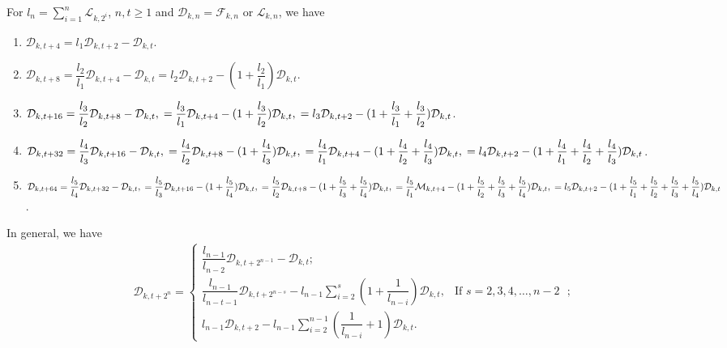 \begin{theorem} For $l_n=\sum\limits_{i=1}^n\mathcal{L}_{k,2^i}$, $n, t\geq 1$ and $\mathcal{D}_{k,n}=\mathcal{F}_{k,n}$ or $\mathcal{L}_{k,n}$, we have\label{3.10}
\begin{enumerate}
\item $\mathcal{D}_{k,t+4}=l_1\mathcal{D}_{k,t+2}-\mathcal{D}_{k,t} $.
\item $\mathcal{D}_{k,t+8}=\dfrac{l_2}{l_1}\mathcal{D}_{k,t+4}-\mathcal{D}_{k,t} =l_2\mathcal{D}_{k,t+2}-(1+\dfrac{l_2}{l_1})\mathcal{D}_{k,t} $.
\item $\mathcal{D}_{k,t+16}=\dfrac{l_3}{l_2}\mathcal{D}_{k,t+8}-\mathcal{D}_{k,t},\\ =\dfrac{l_3}{l_1}\mathcal{D}_{k,t+4}-(1+\dfrac{l_3}{l_2})\mathcal{D}_{k,t},\\ = {l_3}\mathcal{D}_{k,t+2}-(1+\dfrac{l_3}{l_1}+\dfrac{l_3}{l_2})\mathcal{D}_{k,t}$.
\item $\mathcal{D}_{k,t+32}=\dfrac{l_4}{l_3}\mathcal{D}_{k,t+16}-\mathcal{D}_{k,t},\\ =\dfrac{l_4}{l_2}\mathcal{D}_{k,t+8}-(1+\dfrac{l_4}{l_3})\mathcal{D}_{k,t},\\ = \dfrac{l_4}{l_1}\mathcal{D}_{k,t+4}-(1+\dfrac{l_4}{l_2}+\dfrac{l_4}{l_3})\mathcal{D}_{k,t},\\ = {l_4}\mathcal{D}_{k,t+2}-(1+\dfrac{l_4}{l_1}+\dfrac{l_4}{l_2}+\dfrac{l_4}{l_3})\mathcal{D}_{k,t}$.
\item $\mathcal{D}_{k,t+64}=\dfrac{l_5}{l_4}\mathcal{D}_{k,t+32}-\mathcal{D}_{k,t},\\
=\dfrac{l_5}{l_3}\mathcal{D}_{k,t+16}-(1+\dfrac{l_5}{l_4})\mathcal{D}_{k,t},\\
= \dfrac{l_5}{l_2}\mathcal{D}_{k,t+8}-(1+\dfrac{l_5}{l_3}+\dfrac{l_5}{l_4})\mathcal{D}_{k,t},\\
=\dfrac{l_5}{l_1}\mathcal{M}_{k,t+4}-(1+\dfrac{l_5}{l_2}+\dfrac{l_5}{l_3}+\dfrac{l_5}{l_4})\mathcal{D}_{k,t},\\
={l_5}\mathcal{D}_{k,t+2}-(1+\dfrac{l_5}{l_1}+\dfrac{l_5}{l_2}+\dfrac{l_5}{l_3}+\dfrac{l_5}{l_4})\mathcal{D}_{k,t}$.
\end{enumerate}
In general, we have
\begin{align*}
 \mathcal{D}_{k,{t+2^n}}= \begin{cases}
 \dfrac{l_{n-1}}{l_{n-2}} \mathcal{D}_{k,t+2^{n-1}}- \mathcal{D}_{k,t};\\
\dfrac{l_{n-1}}{l_{n-t-1}} \mathcal{D}_{k,{t+2^{n-s}}}-l_{n-1}\sum\limits_{i=2}^{s}(1+\dfrac{1}{l_{n-i}}) \mathcal{D}_{k,t}, & \text{If $s=2, 3, 4,\hdots, n-2 $ };\\l_{n-1} \mathcal{D}_{k,{t+2}}-l_{n-1}\sum\limits_{i=2}^{n-1}(\dfrac{1}{l_{n-i}}+1) \mathcal{D}_{k,t}.
 \end{cases}
\end{align*}
 \end{theorem}
